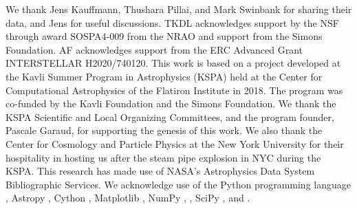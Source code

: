 \IfFileExists{emulateapjlegacy.cls}{\documentclass[iop]{emulateapjlegacy}}{\documentclass[iop]{emulateapj}}
\begin{document}
\acknowledgements

We thank Jens Kauffmann, Thushara Pillai, and Mark Swinbank for sharing their data, and Jens for useful discussions.
%
TKDL acknowledges support by the NSF through award SOSPA4-009 from the NRAO and support from the Simons Foundation.
%
AF acknowledges support from the ERC Advanced Grant INTERSTELLAR H2020/740120.
%
This work is based on a project developed at the Kavli Summer Program in Astrophysics (KSPA) held at the Center for Computational Astrophysics of the Flatiron Institute in 2018. The program was co-funded by the Kavli Foundation and the Simons Foundation.
%
We thank the KSPA Scientific and Local Organizing Committees, and the program founder, Pascale Garaud, for supporting the genesis of this work.
%
We also thank the Center for Cosmology and Particle Physics at the New York University for their hospitality in hosting us after the steam pipe explosion in NYC during the KSPA.
%
This research has made use of NASA's Astrophysics Data System Bibliographic Services.
%
We acknowledge use of the Python programming language \citep{VanRossum1991}, Astropy \citep{astropy}, Cython \citep{behnel2010cython}, Matplotlib \citep{Hunter2007}, NumPy \citep{VanDerWalt2011},  \citep{Labadens2012}, SciPy \citep{scipyref}, and  \citep{Smith09a,Turk11a}.
%



\end{document}
